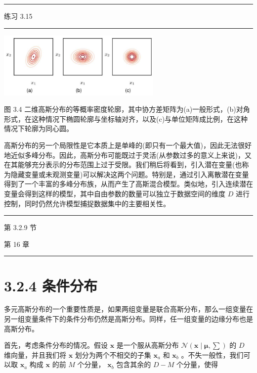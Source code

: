 \documentclass[10pt]{report}
\newcommand{\HRule}{\begin{center}\rule{0.9\linewidth}{0.2mm}\end{center}}
\begin{document}
\HRule

练习 3.15

\HRule

\begin{center}
\includegraphics[max width=0.6\textwidth]{images/0194e279-9b28-703a-88f4-c3ac21e2010d_95_699_344_842_337_0.jpg}
\end{center}
\hspace*{3em} 

图 3.4 二维高斯分布的等概率密度轮廓，其中协方差矩阵为(a)一般形式，(b)对角形式，在这种情况下椭圆轮廓与坐标轴对齐，以及(c)与单位矩阵成比例，在这种情况下轮廓为同心圆。

高斯分布的另一个局限性是它本质上是单峰的(即只有一个最大值)，因此无法很好地近似多峰分布。因此，高斯分布可能既过于灵活(从参数过多的意义上来说)，又在其能够充分表示的分布范围上过于受限。我们稍后将看到，引入潜在变量(也称为隐藏变量或未观测变量)可以解决这两个问题。特别是，通过引入离散潜在变量得到了一个丰富的多峰分布族，从而产生了高斯混合模型。类似地，引入连续潜在变量会得到这样的模型，其中自由参数的数量可以独立于数据空间的维度 \(D\) 进行控制，同时仍然允许模型捕捉数据集中的主要相关性。

\HRule

第 3.2.9 节

第 16 章

\HRule

\section*{3.2.4 条件分布}

多元高斯分布的一个重要性质是，如果两组变量是联合高斯分布，那么一组变量在另一组变量条件下的条件分布仍然是高斯分布。同样，任一组变量的边缘分布也是高斯分布。

首先，考虑条件分布的情况。假设 \(\mathbf{x}\) 是一个服从高斯分布 \(\mathcal{N}\left( {\mathbf{x} \mid  \mathbf{\mu },\mathbf{\sum }}\right)\) 的 \(D\) 维向量，并且我们将 \(\mathbf{x}\) 划分为两个不相交的子集 \({\mathbf{x}}_{a}\) 和 \({\mathbf{x}}_{b}\) 。不失一般性，我们可以取 \({\mathbf{x}}_{a}\) 构成 \(\mathbf{x}\) 的前 \(M\) 个分量， \({\mathbf{x}}_{b}\) 包含其余的 \(D - M\) 个分量，使得
\end{document}
